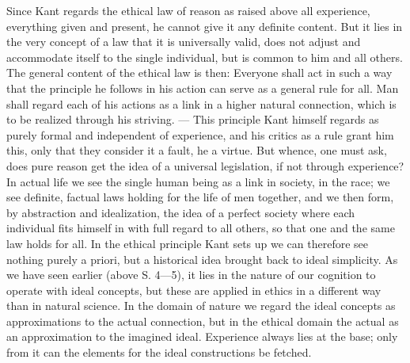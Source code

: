 \documentclass[12pt,a4paper,openany]{book}
\newcommand{\opage}[1]{\marginnote{\footnotesize\textit{[#1]}}}
\begin{document}
Since Kant regards the ethical law of reason as \opage{52}raised above all
experience, everything given and present, he cannot give it any definite
content. But it lies in the very concept of a law that it is universally
valid, does not adjust and accommodate itself to the single individual, but is
common to him and all others. The general content of the ethical law is then:
Everyone shall act in such a way that the principle he follows in his action
can serve as a general rule for all. Man shall regard each of his actions as a
link in a higher natural connection, which is to be realized through his
striving. --- This principle Kant himself regards as purely formal and
independent of experience, and his critics as a rule grant him this, only that
they consider it a fault, he a virtue. But whence, one must ask, does pure
reason get the idea of a universal legislation, if not through experience? In
actual life we see the single human being as a link in society, in the race;
we see definite, factual laws holding for the life of men together, and we
then form, by abstraction and idealization, the idea of a perfect society
where each individual fits himself in with full regard to all others, so that
one and the same law holds for all. In the ethical principle Kant sets up we
can therefore see nothing purely a priori, but a historical idea brought back
to ideal simplicity. As we have seen earlier (above S. 4---5), it lies in the
nature of our cognition to operate with ideal concepts, but these are applied
in ethics in a different way than in natural science. In the domain of nature
\opage{53}we regard the ideal concepts as approximations to the actual
connection, but in the ethical domain the actual as an approximation to the
imagined ideal. Experience always lies at the base; only from it can the
elements for the ideal constructions be fetched.
\end{document}
